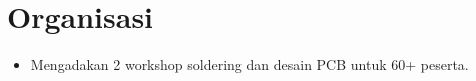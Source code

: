 \section{Organisasi}
\begin{itemize}
  \item Mengadakan 2 workshop soldering dan desain PCB untuk 60+ peserta.
\end{itemize}
